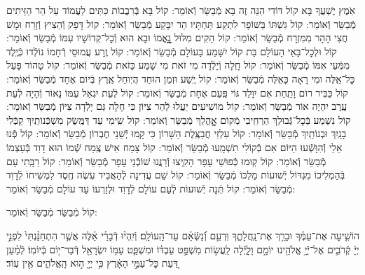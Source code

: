 \documentclass[twoside, openany, parskip=half, 11pt]{book}
\begin{document}
\begin{small}
אֹֽמֶץ יֶשְׁעֲךָ בָּא קוֹל דּוֹדִי הִנֵּה זֶה בָּא מְֿבַשֵּׂר וְֿאוֹמֵר:
קוֹל בָּא בְּֿרִבֲבוֹת כִּתִּים לַעֲמוֹד עַל הַר הַזֵּיתִים מְֿבַשֵּׂר וְֿאוֹמֵר:
קוֹל גִּשְׁתּוֹ בַּשּׁוֹפָר לִתְקַע תַּחְתָּיו הַר יִבָּקַע מְֿבַשֵּׂר וְֿאוֹמֵר:
קוֹל דָּפַק וְֿהֵצִיץ וְֿזָרַח וּמָשׁ חֲצִי הָהָר מִמִּזְרָח מְֿבַשֵּׂר וְֿאוֹמֵר:
קוֹל הֵקִים מִלּוּל נׇׇׇָאֳמוֹ וּבָא הוּא וְֿכׇל־קְדוֹשָׁיו עִמּוֹ מְֿבַשֵּׂר וְֿאוֹמֵר:
קוֹל וּלְכׇל־בָּאֵי הָעוֹלָם בַּת קוֹל יִשָּׁמַע בָּעוֹלָם מְֿבַשֵּׂר וְֿאוֹמֵר:
קוֹל זֶֽרַע עֲמוּסֵי רְֿחָמוֹ נוֹלְֿדוּ כְּֿיֶֽלֶד מִמְּֿעֵי אִמּוֹ מְֿבַשֵּׂר וְֿאוֹמֵר:
קוֹל חָֽלָה וְֿיָלְֿדָה מִי זֹאת מִי שָׁמַע כָּזֹאת מְֿבַשֵּׂר וְֿאוֹמֵר:
קוֹל טָהוֹר פָּעַל כׇּל־אֵֽלֶּה וּמִי רָאָה כָּאֵלֶּה מְֿבַשֵּׂר וְֿאוֹמֵר:
קוֹל יֶֽשַׁע וּזְמַן הוּחַד הֲיֽוּחַל אֶֽרֶץ בְּֿיוֹם אֶחָד מְֿבַשֵּׂר וְֿאוֹמֵר:
קוֹל כַּבִּיר רוֹם וָתַֽחַת אִם יִוָּלֵד גּוֹי פַּֽעַם אֶחָת מְֿבַשֵּׂר וְֿאוֹמֵר:
קוֹל לְֿעֵת יִגְאַל עַמּוֹ נָאוֹר וְֿהָיָה לְֿעֵת עֶֽרֶב יִהְיֶה אוֹר מְֿבַשֵּׂר וְֿאוֹמֵר:
קוֹל מוֹשִׁיעִים יַעֲלוּ לְֿהַר צִיּוֹן כִּי חָלָה גַּם יָלְֿדָה צִיּוֹן מְֿבַשֵּׂר וְֿאוֹמֵר:
קוֹל נִשְׁמַע בְּֿכׇל־גְּֿבוּלֵךְ הַרְחִֽיבִי מְֿקוֹם אׇׇׇׇׇָהֳלֵךְ מְֿבַשֵּׂר וְֿאוֹמֵר:
קוֹל שִֽׂימִי עַד דַּמֶּֽשֶׂק מִשְׁכְּֿנוֹתַֽיִךְ קַבְּֿלִי בָנַֽיִךְ וּבְנוֹתַֽיִךְ מְֿבַשֵּׂר וְֿאוֹמֵר:
קוֹל עִלְזִי חֲבַצֶּֽלֶת הַשָּׁרוֹן כִּי קָֽמוּ יְֿשֵׁנֵי חֶבְרוֹן מְֿבַשֵּׂר וְֿאוֹמֵר:
קוֹל פְּֿנוּ אֵלַי וְֿהִוָּשְֿׁעוּ הַיּוֹם אִם בְּֿקוֹלִי תִשְׁמָֽעוּ מְֿבַשֵּׂר וְֿאוֹמֵר:
קוֹל צָמַח אִישׁ צֶֽמַח שְֿׁמוֹ הוּא דָוִד בְּֿעַצְמוֹ מְֿבַשֵּׂר וְֿאוֹמֵר:
קוֹל קֽוּמוּ כְּֿפוּשֵׁי עָפָר הָקִֽיצוּ וְֿרַנֲּנוּ שׁוֹכְֿנֵי עָפָר מְֿבַשֵּׂר וְֿאוֹמֵר:
קוֹל רַבָּֽתִי עָם בְּֿהַמְלִיכוֹ מִגְדּוֹל יְֿשׁוּעוֹת מַלְכּוֹ מְֿבַשֵּׂר וְֿאוֹמֵר:
קוֹל שֵׁם עֲדִינָה לְֿהַאֲבִיד עֹֽשֶׂה חֶֽסֶד לִמְשִׁיחוֹ לְֿדָוִד מְֿבַשֵּׂר וְֿאוֹמֵר:
קוֹל תְּֿנָה יְֿשׁוּעוֹת לְֿעַם עוֹלָם לְֿדָוִד וּלְזַרְעוֹ עַד עוֹלָם מְֿבַשֵּׂר וְֿאוֹמֵר:

\end{small}

\begin{large}
קוֹל מְֿבַשֵּׂר מְֿבַשֵּׂר וְֿאוֹמֵר:

\end{large}

הוֹשִׁ֤יעָה אֶת־עַמֶּ֗ךָ וּבָרֵ֥ךְ אֶת־נַֽחֲלָתֶ֑ךָ וּֽרְעֵ֥ם וְֿ֝נַשְּֿׂאֵ֗ם עַד־הָֽעוֹלָֽם׃ וְֿיִֽהְי֨וּ דְֿבָרַ֜י אֵ֗לֶּה אֲשֶׁ֤ר הִתְחַנַּ֨נְתִּי֙ לִפְנֵ֣י יְיָ֔ קְֿרֹבִ֛ים אֶל־יְֿיָ֥ אֱלֹהֵ֖ינוּ יוֹמָ֣ם וָלָ֑יְֿלָה לַֽעֲשׂ֣וֹת מִשְׁפַּ֣ט עַבְדּ֗וֹ וּמִשְׁפַּ֛ט עַמּ֥וֹ יִשְׂרָאֵ֖ל דְּֿבַר־י֥וֹם בְּֿיוֹמֽוֹ׃ לְֿמַ֗עַן דַּ֚עַת כׇּל־עַמֵּ֣י הָאָ֔רֶץ כִּ֥י יְיָ֖ ה֣וּא הָֽאֱלֹהִ֑ים אֵ֖ין עֽוֹד׃

\end{document}
